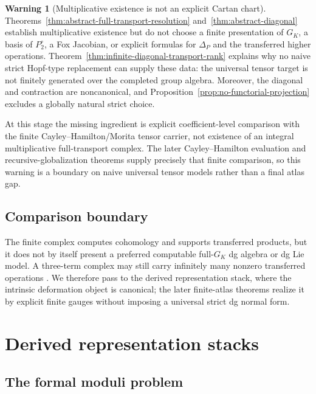 \documentclass[11pt]{article}
\theoremstyle{definition}
\newtheorem{warning}[theorem]{Warning}
\begin{document}
\begin{warning}[Multiplicative existence is not an explicit Cartan chart]\label{warn:abstract-resolution-not-explicit}
Theorems~\ref{thm:abstract-full-transport-resolution} and~\ref{thm:abstract-diagonal} establish multiplicative existence but do not choose a finite presentation of $G_K$, a basis of $P_2^{\circ}$, a Fox Jacobian, or explicit formulas for $\Delta_P$ and the transferred higher operations.  Theorem~\ref{thm:infinite-diagonal-transport-rank} explains why no naive strict Hopf-type replacement can supply these data: the universal tensor target is not finitely generated over the completed group algebra.  Moreover, the diagonal and contraction are noncanonical, and Proposition~\ref{prop:no-functorial-projection} excludes a globally natural strict choice.

At this stage the missing ingredient is explicit coefficient-level comparison with the finite Cayley--Hamilton/Morita tensor carrier, not existence of an integral multiplicative full-transport complex.  The later Cayley--Hamilton evaluation and recursive-globalization theorems supply precisely that finite comparison, so this warning is a boundary on naive universal tensor models rather than a final atlas gap.
\end{warning}

\subsection{Comparison boundary}

The finite complex computes cohomology and supports transferred products, but it does not by itself present a preferred computable full-$G_K$ dg algebra or dg Lie model.  A three-term complex may still carry infinitely many nonzero transferred operations \cite{WangErickson}.  We therefore pass to the derived representation stack, where the intrinsic deformation object is canonical; the later finite-atlas theorems realize it by explicit finite gauges without imposing a universal strict dg normal form.

\section{Derived representation stacks}\label{sec:derived-envelope}

\subsection{The formal moduli problem}
\end{document}
